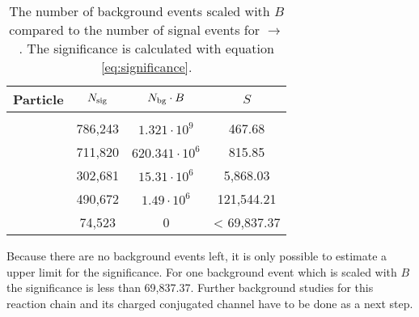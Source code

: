 \begin{table}
	\centering
	\caption{\propose The number of background events scaled with $B$ compared to the number of signal events for \pbarpSystem $\rightarrow$ \excitedcascade \anticascade.
		The significance is calculated with equation \ref{eq:significance}.}
	\label{bg_compared_reco_with_scaling}
	\begin{tabular}{lccc}
		\hline
		Particle & $N_{\textnormal{sig}}$ & $N_{\textnormal{bg}} \cdot B$ & $S$\\
		\hline
		\hline
		& & &\\
		\lam & 786,243 &$ 1.321 \cdot 10^{9}$& 467.68\\
		\alam & 711,820 & $620.341 \cdot 10^{6}$ & 815.85\\
		\anticascade & 302,681 & $15.31 \cdot 10^{6}$ & 5,868.03\\
		\excitedcascade &490,672  & $1.49 \cdot 10^{6}$& 121,544.21\\
		\excitedcascade \anticascade &  74,523 & 0 & < 69,837.37\\
		\hline
		 
		  
	\end{tabular}
\end{table}
Because there are no background events left, it is only possible to estimate a upper limit for the significance.
For one background event which is scaled with $B$ the significance is less than 69,837.37.
Further background studies for this reaction chain and its charged conjugated channel have to be done as a next step.
	